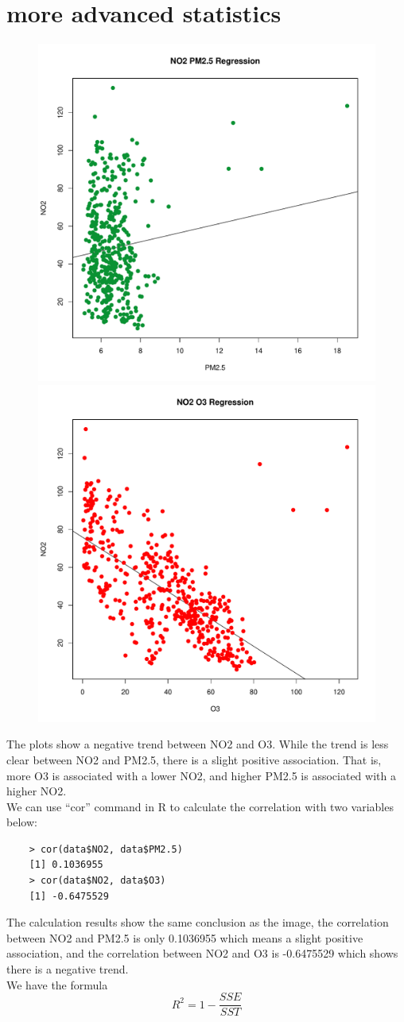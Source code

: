 \documentclass[a4paper,11pt,reqno]{report}
\begin{document}
\section{more advanced statistics}
\label{sec:more advanced statistics}
\begin{figure}[H]
    \centering
    \vspace{-0.35cm}
    \includegraphics[width=0.4\linewidth]{figures/NO2_PM25_Regression.pdf}
    \includegraphics[width=0.4\linewidth]{figures/NO2_O3_Regression.pdf}
\end{figure}
The plots show a negative trend between NO2 and O3. While the trend is less clear between NO2 and PM2.5, there is a slight positive association.
That is, more O3 is associated with a lower NO2, and higher PM2.5 is associated with a higher NO2.
\\
We can use ``cor'' command in R to calculate the correlation with two variables below:
\begin{lstlisting}
    > cor(data$NO2, data$PM2.5)
    [1] 0.1036955
    > cor(data$NO2, data$O3)   
    [1] -0.6475529
\end{lstlisting}
The calculation results show the same conclusion as the image, 
the correlation between NO2 and PM2.5 is only 0.1036955 which means a slight positive association, 
and the correlation between NO2 and O3 is -0.6475529 which shows there is a negative trend.
\\
We have the formula
\begin{equation}
    R^2=1-\frac{SSE}{SST}
\end{equation}
\end{document}
